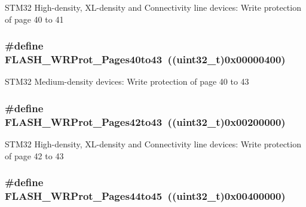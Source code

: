STM32 High-\/density, XL-\/density and Connectivity line devices: Write protection of page 40 to 41 \hypertarget{group__Option__Bytes__Write__Protection_ga30798723c36db2b8145b6a5c8ffafded}{
\subsubsection[{FLASH\_\-WRProt\_\-Pages40to43}]{\setlength{\rightskip}{0pt plus 5cm}\#define FLASH\_\-WRProt\_\-Pages40to43~((uint32\_\-t)0x00000400)}}
\label{group__Option__Bytes__Write__Protection_ga30798723c36db2b8145b6a5c8ffafded}
STM32 Medium-\/density devices: Write protection of page 40 to 43 \hypertarget{group__Option__Bytes__Write__Protection_gab9583317ad7ec30119cdd97e17e74121}{
\subsubsection[{FLASH\_\-WRProt\_\-Pages42to43}]{\setlength{\rightskip}{0pt plus 5cm}\#define FLASH\_\-WRProt\_\-Pages42to43~((uint32\_\-t)0x00200000)}}
\label{group__Option__Bytes__Write__Protection_gab9583317ad7ec30119cdd97e17e74121}
STM32 High-\/density, XL-\/density and Connectivity line devices: Write protection of page 42 to 43 \hypertarget{group__Option__Bytes__Write__Protection_ga934a862a6a5cd350f00f5ded27e4bbd4}{
\subsubsection[{FLASH\_\-WRProt\_\-Pages44to45}]{\setlength{\rightskip}{0pt plus 5cm}\#define FLASH\_\-WRProt\_\-Pages44to45~((uint32\_\-t)0x00400000)}}
\label{group__Option__Bytes__Write__Protection_ga934a862a6a5cd350f00f5ded27e4bbd4}
